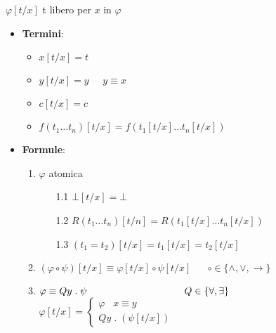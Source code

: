 \documentclass{article}
\theoremstyle{break}
\theoremstyle{break}
\theoremstyle{break}
\theoremstyle{break}
\begin{document}
\begin{figure}[H]
  \begin{definition}[Sostituzione]
    \( \varphi[t/x] \) t libero per \( x \) in \( \varphi \) 
    \begin{itemize}
      \item \textbf{Termini}:
        \begin{itemize}
          \item 
            \(
            x[t/x] = t
            \) 
          \item 
            \(
            y[t/x] = y\;\;\;\;\; y \equiv x
            \) 
          \item 
            \(
            c[t/x] = c
            \) 
          \item 
            \(
            f(t_1 \ldots t_n)[t/x] = f(t_1[t/x] \ldots t_n[t/x])
            \) 
        \end{itemize}
      \item \textbf{Formule}:
        \begin{enumerate}
          \item \( \varphi \) atomica
            \begin{enumerate}
              \item[1.1] \(
                \bot[t/x] = \bot
                \) 
              \item[1.2]
                \( R(t_1 \ldots t_n)[t/n] = R(t_1[t/x] \ldots t_n[t/x]) \) 
              \item [1.3]
                \( (t_1 = t_2)[t/x] = t_1[t/x] = t_2[t/x] \)
            \end{enumerate}
          \item \( (\varphi \circ \psi)[t/x] \equiv \varphi[t/x] \circ \psi[t/x] \;\;\;\;\;\; \circ \in \{\wedge, \vee, \to \} \)
          \item \( \varphi \equiv Qy\;.\;\psi \hspace{3.5cm} Q \in \{\forall , \exists \}  \) \\
            \(
            \varphi[t/x] = \begin{cases}
              \varphi\;\;\; x \equiv y\\
              Qy\;.\;(\psi[t/x])
            \end{cases}
            \) 
        \end{enumerate}
    \end{itemize}
  \end{definition}
\end{figure}
\end{document}
